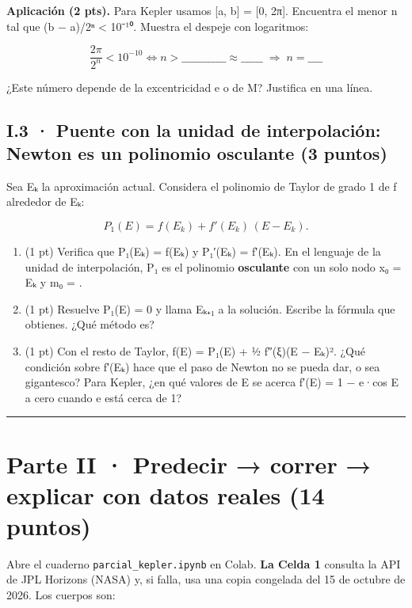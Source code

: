 \textbf{Aplicación (2 pts).} Para Kepler usamos {[}a, b{]} = {[}0, 2π{]}. Encuentra el menor n tal que (b − a)/2ⁿ \textless{} 10⁻¹⁰. Muestra el despeje con logaritmos:

\[\frac{2\pi}{2^n} < 10^{-10} \iff n > \_\_\_\_\_\_\_\_\_\_\_\_ \approx \_\_\_\_\_\_ \;\Rightarrow\; n = \_\_\_\_\]

¿Este número depende de la excentricidad e o de M? Justifica en una línea.


\subsection{I.3 · Puente con la unidad de interpolación: Newton es un polinomio osculante (3 puntos)}

Sea Eₖ la aproximación actual. Considera el polinomio de Taylor de grado 1 de f alrededor de Eₖ:

\[P_1(E) = f(E_k) + f'(E_k)\,(E - E_k).\]

\begin{enumerate}
\def\labelenumi{\alph{enumi})}
\item
  (1 pt) Verifica que P₁(Eₖ) = f(Eₖ) y P₁′(Eₖ) = f′(Eₖ). En el lenguaje de la unidad de interpolación, P₁ es el polinomio \textbf{osculante} con un solo nodo x₀ = Eₖ y m₀ =  .
\item
  (1 pt) Resuelve P₁(E) = 0 y llama Eₖ₊₁ a la solución. Escribe la fórmula que obtienes. ¿Qué método es?
\item
  (1 pt) Con el resto de Taylor, f(E) = P₁(E) + ½ f″(ξ)(E − Eₖ)². ¿Qué condición sobre f′(Eₖ) hace que el paso de Newton no se pueda dar, o sea gigantesco? Para Kepler, ¿en qué valores de E se acerca f′(E) = 1 − e·cos E a cero cuando e está cerca de 1?
\end{enumerate}


\begin{center}\rule{0.5\linewidth}{0.5pt}\end{center}

\section{Parte II · Predecir → correr → explicar con datos reales (14 puntos)}

Abre el cuaderno \texttt{parcial\_kepler.ipynb} en Colab. \textbf{La Celda 1} consulta la API de JPL Horizons (NASA) y, si falla, usa una copia congelada del 15 de octubre de 2026. Los cuerpos son:

